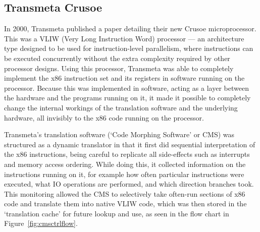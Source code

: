 \subsection{Transmeta Crusoe}
In 2000, Transmeta\cite{TransmetaCodeMorph} published a paper detailing their
new Crusoe microprocessor. This was a VLIW (Very Long Instruction Word)
processor --- an architecture type designed to be used for instruction-level
parallelism, where instructions can be executed concurrently without the extra
complexity required by other processor designs. Using this processor, Transmeta
was able to completely implement the x86 instruction set and its registers in
software running on the processor. Because this was implemented in software,
acting as a layer between the hardware and the programs running on it, it made
it possible to completely change the internal workings of the translation
software and the underlying hardware, all invisibly to the x86 code running on
the processor.

Transmeta's translation software (`Code Morphing Software' or CMS) was
structured as a dynamic translator in that it first did sequential
interpretation of the x86 instructions, being careful to replicate all
side-effects such as interrupts and memory access ordering. While doing this, it
collected information on the instructions running on it, for example how often
particular instructions were executed, what IO operations are performed, and
which direction branches took.  This monitoring allowed the CMS to selectively
take often-run sections of x86 code and translate them into native VLIW code,
which was then stored in the `translation cache' for future lookup and use, as
seen in the flow chart in Figure~\ref{fig:cmsctrlflow}.

